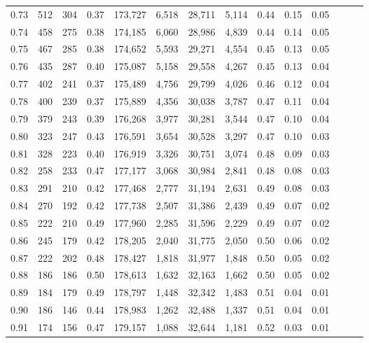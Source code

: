 \begin{tabular}{rrrrrrrrrrrrrr}
0.73 &    512 &  304 &  0.37 &  173,727 &    6,518 &  28,711 &   5,114 &  0.44 &  0.15 &      0.05 \\
0.74 &    458 &  275 &  0.38 &  174,185 &    6,060 &  28,986 &   4,839 &  0.44 &  0.14 &      0.05 \\
0.75 &    467 &  285 &  0.38 &  174,652 &    5,593 &  29,271 &   4,554 &  0.45 &  0.13 &      0.05 \\
0.76 &    435 &  287 &  0.40 &  175,087 &    5,158 &  29,558 &   4,267 &  0.45 &  0.13 &      0.04 \\
0.77 &    402 &  241 &  0.37 &  175,489 &    4,756 &  29,799 &   4,026 &  0.46 &  0.12 &      0.04 \\
0.78 &    400 &  239 &  0.37 &  175,889 &    4,356 &  30,038 &   3,787 &  0.47 &  0.11 &      0.04 \\
0.79 &    379 &  243 &  0.39 &  176,268 &    3,977 &  30,281 &   3,544 &  0.47 &  0.10 &      0.04 \\
0.80 &    323 &  247 &  0.43 &  176,591 &    3,654 &  30,528 &   3,297 &  0.47 &  0.10 &      0.03 \\
0.81 &    328 &  223 &  0.40 &  176,919 &    3,326 &  30,751 &   3,074 &  0.48 &  0.09 &      0.03 \\
0.82 &    258 &  233 &  0.47 &  177,177 &    3,068 &  30,984 &   2,841 &  0.48 &  0.08 &      0.03 \\
0.83 &    291 &  210 &  0.42 &  177,468 &    2,777 &  31,194 &   2,631 &  0.49 &  0.08 &      0.03 \\
0.84 &    270 &  192 &  0.42 &  177,738 &    2,507 &  31,386 &   2,439 &  0.49 &  0.07 &      0.02 \\
0.85 &    222 &  210 &  0.49 &  177,960 &    2,285 &  31,596 &   2,229 &  0.49 &  0.07 &      0.02 \\
0.86 &    245 &  179 &  0.42 &  178,205 &    2,040 &  31,775 &   2,050 &  0.50 &  0.06 &      0.02 \\
0.87 &    222 &  202 &  0.48 &  178,427 &    1,818 &  31,977 &   1,848 &  0.50 &  0.05 &      0.02 \\
0.88 &    186 &  186 &  0.50 &  178,613 &    1,632 &  32,163 &   1,662 &  0.50 &  0.05 &      0.02 \\
0.89 &    184 &  179 &  0.49 &  178,797 &    1,448 &  32,342 &   1,483 &  0.51 &  0.04 &      0.01 \\
0.90 &    186 &  146 &  0.44 &  178,983 &    1,262 &  32,488 &   1,337 &  0.51 &  0.04 &      0.01 \\
0.91 &    174 &  156 &  0.47 &  179,157 &    1,088 &  32,644 &   1,181 &  0.52 &  0.03 &      0.01 \\

\end{tabular}
